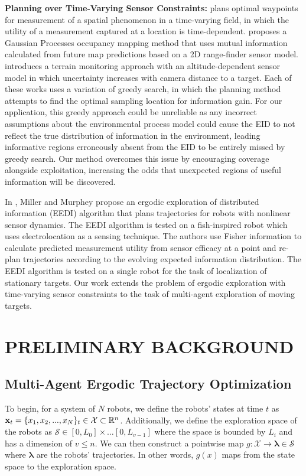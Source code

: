 \documentclass[letterpaper, 10 pt, conference]{ieeeconf}  %
\begin{document}
\textbf{Planning over Time-Varying Sensor Constraints:}
\cite{binney2013optimizing} plans optimal waypoints for measurement of a spatial phenomenon in a time-varying field, in which the utility of a measurement captured at a location is time-dependent. \cite{ghaffari2018gaussian} proposes a Gaussian Processes occupancy mapping method that uses mutual information  calculated from future map predictions based on a 2D range-finder sensor model. \cite{popovic2020informative} introduces a terrain monitoring approach with an altitude-dependent sensor model in which uncertainty increases with camera distance to a target. 
Each of these works uses a variation of greedy search, in which the planning method attempts to find the optimal sampling location for information gain. For our application, this greedy approach could be unreliable as any incorrect assumptions about the environmental process model could cause the EID to not reflect the true distribution of information in the environment, leading informative regions erroneously absent from the EID to be entirely missed by greedy search. Our method overcomes this issue by encouraging coverage alongside exploitation, increasing the odds that unexpected regions of useful information will be discovered.

In \cite{miller2015ergodic}, Miller and Murphey propose an ergodic exploration of distributed information (EEDI) algorithm that plans trajectories for robots with nonlinear sensor dynamics. The EEDI algorithm is tested on a fish-inspired robot which uses electrolocation as a sensing technique. The authors use Fisher information to calculate predicted measurement utility from sensor efficacy at a point and re-plan trajectories according to the evolving expected information distribution. The EEDI algorithm is tested on a single robot for the task of localization of stationary targets. Our work extends the problem of ergodic exploration with time-varying sensor constraints to the task of multi-agent exploration of moving targets.
\section{PRELIMINARY BACKGROUND}
\subsection{Multi-Agent Ergodic Trajectory Optimization}
To begin, for a system of $N$ robots, we define the robots' states at time $t$ as $\bold{x}_t = \{x_1, x_2, ..., x_N\}_t \in \mathcal{X} \subset \mathbb{R}^n$. Additionally, we define the exploration space of the robots as $\mathcal{S} \in [0,L_0]\times \ldots [0, L_{v-1}]$ where the space is bounded by $L_i$ and has a dimension of $v\leq n$. We can then construct a pointwise map $g: \mathcal{X} \to \boldsymbol{\lambda} \in \mathcal{S}$ where $\boldsymbol{\lambda}$ are the robots' trajectories. In other words, $g(x)$ maps from the state space to the exploration space.
\end{document}
